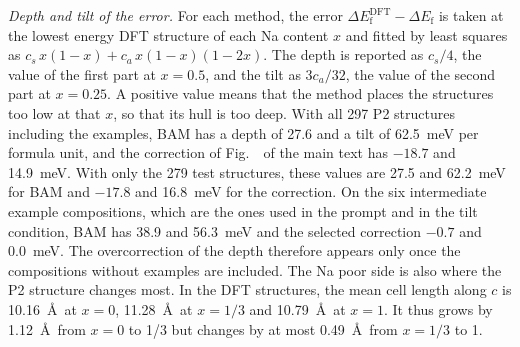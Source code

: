 \textit{Depth and tilt of the error.} For each method, the error $\Delta E_\mathrm{f}^\mathrm{DFT}-\Delta E_\mathrm{f}$ is taken at the lowest energy DFT structure of each Na content $x$ and fitted by least squares as $c_s\,x(1-x)+c_a\,x(1-x)(1-2x)$. The depth is reported as $c_s/4$, the value of the first part at $x=0.5$, and the tilt as $3c_a/32$, the value of the second part at $x=0.25$. A positive value means that the method places the structures too low at that $x$, so that its hull is too deep. With all 297 P2 structures including the examples, BAM has a depth of 27.6 and a tilt of 62.5~meV per formula unit, and the correction of Fig.~\fi\ of the main text has $-18.7$ and 14.9~meV. With only the 279 test structures, these values are 27.5 and 62.2~meV for BAM and $-17.8$ and 16.8~meV for the correction. On the six intermediate example compositions, which are the ones used in the prompt and in the tilt condition, BAM has 38.9 and 56.3~meV and the selected correction $-0.7$ and 0.0~meV. The overcorrection of the depth therefore appears only once the compositions without examples are included. The Na poor side is also where the P2 structure changes most. In the DFT structures, the mean cell length along $c$ is 10.16~\AA\ at $x=0$, 11.28~\AA\ at $x=1/3$ and 10.79~\AA\ at $x=1$. It thus grows by 1.12~\AA\ from $x=0$ to 1/3 but changes by at most 0.49~\AA\ from $x=1/3$ to 1.

